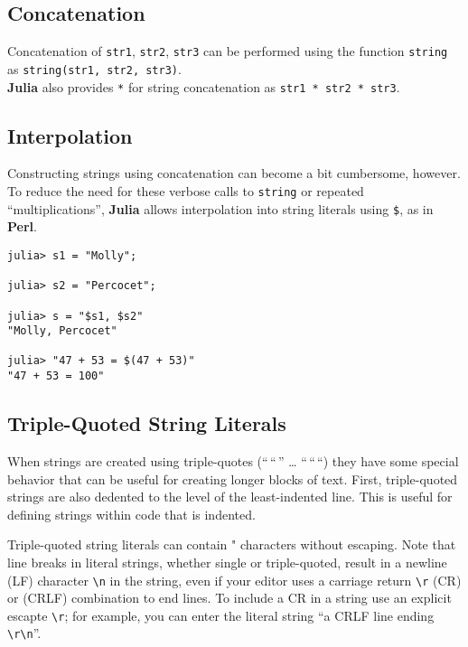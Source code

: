\documentclass[
]{article}
\begin{document}
\hypertarget{concatenation}{%
\subsection{Concatenation}\label{concatenation}}

Concatenation of \texttt{str1}, \texttt{str2}, \texttt{str3} can be
performed using the function \texttt{string} as
\texttt{string(str1,\ str2,\ str3)}.\\
\textbf{Julia} also provides \texttt{*} for string concatenation as
\texttt{str1\ *\ str2\ *\ str3}.

\hypertarget{interpolation}{%
\subsection{Interpolation}\label{interpolation}}

Constructing strings using concatenation can become a bit cumbersome,
however. To reduce the need for these verbose calls to \texttt{string}
or repeated ``multiplications'', \textbf{Julia} allows interpolation
into string literals using \texttt{\$}, as in \textbf{Perl}.

\begin{verbatim}
julia> s1 = "Molly";

julia> s2 = "Percocet";

julia> s = "$s1, $s2"
"Molly, Percocet"

julia> "47 + 53 = $(47 + 53)"
"47 + 53 = 100"
\end{verbatim}

\hypertarget{triple-quoted-string-literals}{%
\subsection{Triple-Quoted String
Literals}\label{triple-quoted-string-literals}}

When strings are created using triple-quotes (``\,``\,'' \ldots{}
``\,``\,``) they have some special behavior that can be useful for
creating longer blocks of text. First, triple-quoted strings are also
dedented to the level of the least-indented line. This is useful for
defining strings within code that is indented.

Triple-quoted string literals can contain " characters without escaping.
Note that line breaks in literal strings, whether single or
triple-quoted, result in a newline (LF) character
\texttt{\textbackslash{}n} in the string, even if your editor uses a
carriage return \texttt{\textbackslash{}r} (CR) or (CRLF) combination to
end lines. To include a CR in a string use an explicit escapte
\texttt{\textbackslash{}r}; for example, you can enter the literal
string ``a CRLF line ending
\texttt{\textbackslash{}r\textbackslash{}n}''.
\end{document}
